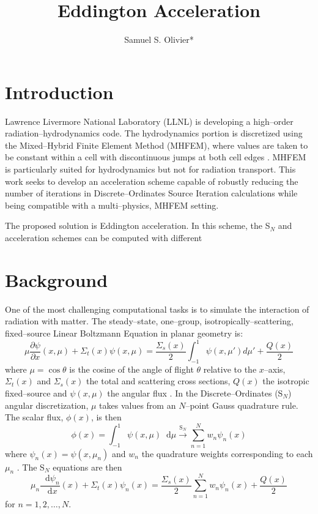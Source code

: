 \documentclass{anstrans}
\title{Eddington Acceleration}
\author{Samuel S. Olivier*}
\institute{Department of Nuclear Engineering, Texas A\&M University, College Station, TX 77843}
\newcommand{\SN}{S$_N$\xspace}
\newcommand{\ud}{\mathop{}\!\mathrm{d}} %
\newcommand{\pderiv}[2]{\frac{\partial #1}{\partial #2}}
\newcommand{\dderiv}[2]{\frac{\ud #1}{\ud #2}}
\begin{document}
\section{Introduction}
	Lawrence Livermore National Laboratory (LLNL) is developing a high--order radiation--hydrodynamics code. The hydrodynamics portion is discretized using the Mixed--Hybrid Finite Element Method (MHFEM), where values are taken to be constant within a cell with discontinuous jumps at both cell edges \cite{mhfem}. MHFEM is particularly suited for hydrodynamics but not for radiation transport. This work seeks to develop an acceleration scheme capable of robustly reducing the number of iterations in Discrete--Ordinates Source Iteration calculations while being compatible with a multi--physics, MHFEM setting. 

	The proposed solution is Eddington acceleration. In this scheme, the \SN and acceleration schemes can be computed with different 

\section{Background}
	One of the most challenging computational tasks is to simulate the interaction of radiation with matter. The steady--state, one--group, isotropically--scattering, fixed--source Linear Boltzmann Equation in planar geometry is: 
		\begin{equation} \label{eq:bte}
			\mu \pderiv{\psi}{x}(x, \mu) + \Sigma_t(x) \psi(x,\mu) = 
			\frac{\Sigma_s(x)}{2} \int_{-1}^{1} \psi(x, \mu') d\mu' + \frac{Q(x)}{2}
		\end{equation}
	where $\mu = \cos\theta$ is the cosine of the angle of flight $\theta$ relative to the $x$--axis, $\Sigma_t(x)$ and $\Sigma_s(x)$ the total and scattering cross sections, $Q(x)$ the isotropic fixed--source and $\psi(x, \mu)$ the angular flux \cite{adams}. In the Discrete--Ordinates (\SN) angular discretization, $\mu$ takes values from an $N$--point Gauss quadrature rule. The scalar flux, $\phi(x)$, is then 
		\begin{equation} \label{eq:quad}
			\phi(x) = \int_{-1}^1 \psi(x, \mu) \ud\mu 
				\xrightarrow{\text{S}_N} \sum_{n=1}^N w_n \psi_n(x)
		\end{equation}
	where $\psi_n(x) = \psi(x,\mu_n)$ and $w_n$ the quadrature weights corresponding to each $\mu_n$ \cite{llnl}. The \SN equations are then 
		\begin{equation} \label{eq:sn}
			\mu_n \dderiv{\psi_n}{x}(x) + \Sigma_t(x) \psi_n(x) = 
			\frac{\Sigma_s(x)}{2} \sum_{n=1}^N w_n \psi_n(x) + \frac{Q(x)}{2} 
		\end{equation}
	for $n = 1, 2, \dots, N$. 
\end{document}
